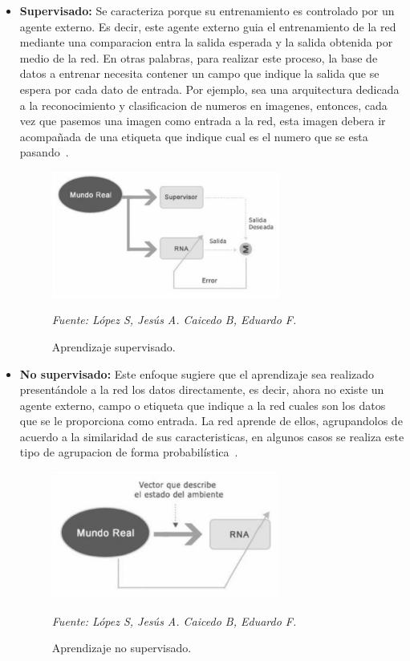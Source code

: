\begin{itemize}
\item \textbf{Supervisado: } Se caracteriza porque su entrenamiento es controlado por un agente
externo. Es decir, este agente externo guia el entrenamiento de la red mediante una comparacion entra la salida esperada y la salida obtenida por medio de la red. En otras palabras, para realizar este proceso, la base de datos a entrenar necesita contener un campo que indique la salida que se espera por cada dato de entrada. Por ejemplo, sea una arquitectura dedicada a la reconocimiento y clasificacion de numeros en imagenes, entonces, cada vez que pasemos una imagen como entrada a la red, esta imagen debera ir acompañada de una etiqueta que indique cual es el numero que se esta pasando~\cite{18restrepo2015aplicacion}.

\begin{figure}[H]
		\centering
		\includegraphics[width=75mm]{Imagenes/grafico_supervisado.png}
		\caption{Aprendizaje supervisado.}
		\vspace{0.15cm}
		\textit{Fuente: López S, Jesús A. Caicedo B, Eduardo F.}
		\label{fig:grafico_supervisado}
\end{figure}



\item \textbf{No supervisado: }
Este enfoque sugiere que el aprendizaje sea realizado presentándole a la red los datos directamente, es decir, ahora no existe un agente externo, campo o etiqueta que indique a la red cuales son los datos que se le proporciona como entrada. La red aprende de ellos, agrupandolos de acuerdo a la similaridad de sus caracteristicas, en algunos casos se realiza este tipo de agrupacion de forma probabilística~\cite{18restrepo2015aplicacion}.

\begin{figure}[H]
		\centering
		\includegraphics[width=75mm]{Imagenes/grafico_no_supervisado.png}
		\caption{Aprendizaje no supervisado.}
		\vspace{0.15cm}
		\textit{Fuente: López S, Jesús A. Caicedo B, Eduardo F.}
		\label{fig:grafico_no_supervisado}
\end{figure}


\end{itemize}
